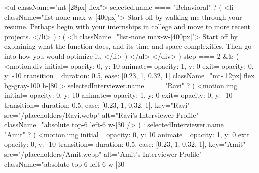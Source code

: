 {{{{{                    <ul className="mt-[28px] flex">
                      {selected.name === "Behavioral" ? (
                        <li className="list-none max-w-[400px]">
                          Start off by walking me through your resume. Perhaps
                          begin with your internships in college and move to
                          more recent projects.
                        </li>
                      ) : (
                        <li className="list-none max-w-[400px]">
                          Start off by explaining what the function does, and
                          its time and space complexities. Then go into how you
                          would optimize it.
                        </li>
                      )}
                    </ul>
                  </div>
                )}
                {step === 2 && (
                  <motion.div
                    initial={{ opacity: 0, y: 10 }}
                    animate={{ opacity: 1, y: 0 }}
                    exit={{ opacity: 0, y: -10 }}
                    transition={{ duration: 0.5, ease: [0.23, 1, 0.32, 1] }}
                    className="mt-[12px] flex bg-gray-100 h-[80%
                  >
                    {selectedInterviewer.name === "Ravi" ? (
                      <motion.img
                        initial={{ opacity: 0, y: 10 }}
                        animate={{ opacity: 1, y: 0 }}
                        exit={{ opacity: 0, y: -10 }}
                        transition={{
                          duration: 0.5,
                          ease: [0.23, 1, 0.32, 1],
                        }}
                        key="Ravi"
                        src="/placeholders/Ravi.webp"
                        alt="Ravi's Interviewer Profile"
                        className="absolute top-6 left-6 w-[30%
                      />
                    ) : selectedInterviewer.name === "Amit" ? (
                      <motion.img
                        initial={{ opacity: 0, y: 10 }}
                        animate={{ opacity: 1, y: 0 }}
                        exit={{ opacity: 0, y: -10 }}
                        transition={{
                          duration: 0.5,
                          ease: [0.23, 1, 0.32, 1],
                        }}
                        key="Amit"
                        src="/placeholders/Amit.webp"
                        alt="Amit's Interviewer Profile"
                        className="absolute top-6 left-6 w-[30%
}}}}}}
